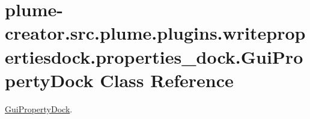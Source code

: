 \hypertarget{classplume-creator_1_1src_1_1plume_1_1plugins_1_1writepropertiesdock_1_1properties__dock_1_1_gui_property_dock}{}\section{plume-\/creator.src.\+plume.\+plugins.\+writepropertiesdock.\+properties\+\_\+dock.\+Gui\+Property\+Dock Class Reference}
\label{classplume-creator_1_1src_1_1plume_1_1plugins_1_1writepropertiesdock_1_1properties__dock_1_1_gui_property_dock}


\hyperlink{classplume-creator_1_1src_1_1plume_1_1plugins_1_1writepropertiesdock_1_1properties__dock_1_1_gui_property_dock}{Gui\+Property\+Dock}.  



